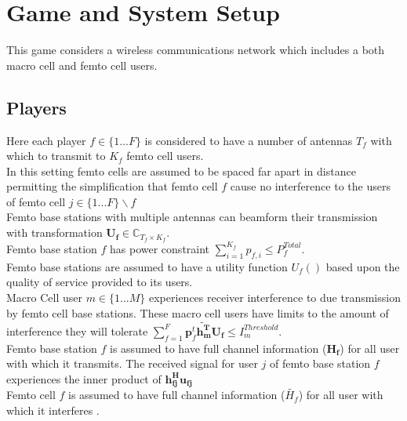 \documentclass[12pt]{article}
\begin{document}
\section{Game and System Setup}

This game considers a wireless communications network which includes a both macro cell and femto cell users.

\subsection{Players}

Here each player  $f \in \{1 ... F\}$ is considered to have a number of antennas $T_f$ with which to transmit to $K_f$ femto cell users.
\\

In this setting femto cells are assumed to be spaced far apart in distance permitting the simplification that 
femto cell $f$ cause no interference to the users of femto cell $j \in \{1 ... F\}\backslash f$
\\


Femto base stations with multiple antennas can beamform their transmission with transformation $\mathbf{U_f} \in \mathbb{C}_{T_f \times K_f}$.
\\

Femto base station $f$ has power constraint  $\sum^{K_f}_{i=1} p_{f,i} \leq P^{Total}_{f} $. 
\\

Femto base stations are assumed to have a utility function $U_f()$ based upon the quality of service provided to its users.
\\

Macro Cell user $m \in \{1 ... M\}$ experiences receiver interference to due transmission by  femto cell base stations. These macro cell users have limits to the amount of interference they will tolerate 
$\sum^F_{f=1} \mathbf{p}_f^t \mathbf{\tilde{h_m^T}}  \mathbf{U_f}  \leq I^{Threshold}_{m} $.
\\

Femto base station $f$ is assumed to have full channel information ($\mathbf{H_f}$) for all user  with which it transmits. The received signal for user $j$ of femto base station $f$ experiences the inner product of $\mathbf{h^H_{fj}u_{fj}}$
\\


Femto cell $f$ is assumed to have full channel information ($\tilde{H_f}$) for all user with which it interferes .
\\
\end{document}
